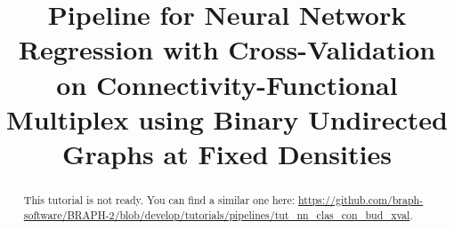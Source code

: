 \documentclass[justified]{tufte-handout}
\title[Regression Cross-Validation Connectivity-Functional Multiplex BUT]{Pipeline for Neural Network Regression with Cross-Validation on Connectivity-Functional Multiplex using Binary Undirected Graphs at Fixed Densities}
\begin{document}
\maketitle

\begin{abstract}
\noindent
This tutorial is not ready. You can find a similar one here: \url{https://github.com/braph-software/BRAPH-2/blob/develop/tutorials/pipelines/tut_nn_clas_con_bud_xval}.
\end{abstract}
\end{document}
